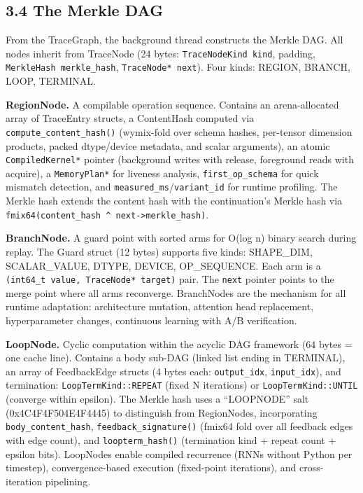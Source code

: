 \subsection{3.4 The Merkle DAG}\label{the-merkle-dag}

From the TraceGraph, the background thread constructs the Merkle DAG. All nodes inherit from TraceNode (24 bytes: \texttt{TraceNodeKind\ kind}, padding, \texttt{MerkleHash\ merkle\_hash}, \texttt{TraceNode*\ next}). Four kinds: REGION, BRANCH, LOOP, TERMINAL.

\textbf{RegionNode.} A compilable operation sequence. Contains an arena-allocated array of TraceEntry structs, a ContentHash computed via \texttt{compute\_content\_hash()} (wymix-fold over schema hashes, per-tensor dimension products, packed dtype/device metadata, and scalar arguments), an atomic \texttt{CompiledKernel*} pointer (background writes with release, foreground reads with acquire), a \texttt{MemoryPlan*} for liveness analysis, \texttt{first\_op\_schema} for quick mismatch detection, and \texttt{measured\_ms}/\texttt{variant\_id} for runtime profiling. The Merkle hash extends the content hash with the continuation's Merkle hash via \texttt{fmix64(content\_hash\ \^{}\ next-\textgreater{}merkle\_hash)}.

\textbf{BranchNode.} A guard point with sorted arms for O(log n) binary search during replay. The Guard struct (12 bytes) supports five kinds: SHAPE\_DIM, SCALAR\_VALUE, DTYPE, DEVICE, OP\_SEQUENCE. Each arm is a \texttt{(int64\_t\ value,\ TraceNode*\ target)} pair. The \texttt{next} pointer points to the merge point where all arms reconverge. BranchNodes are the mechanism for all runtime adaptation: architecture mutation, attention head replacement, hyperparameter changes, continuous learning with A/B verification.

\textbf{LoopNode.} Cyclic computation within the acyclic DAG framework (64 bytes = one cache line). Contains a body sub-DAG (linked list ending in TERMINAL), an array of FeedbackEdge structs (4 bytes each: \texttt{output\_idx}, \texttt{input\_idx}), and termination: \texttt{LoopTermKind::REPEAT} (fixed N iterations) or \texttt{LoopTermKind::UNTIL} (converge within epsilon). The Merkle hash uses a ``LOOPNODE'' salt (0x4C4F4F504E4F4445) to distinguish from RegionNodes, incorporating \texttt{body\_content\_hash}, \texttt{feedback\_signature()} (fmix64 fold over all feedback edges with edge count), and \texttt{loopterm\_hash()} (termination kind + repeat count + epsilon bits). LoopNodes enable compiled recurrence (RNNs without Python per timestep), convergence-based execution (fixed-point iterations), and cross-iteration pipelining.

